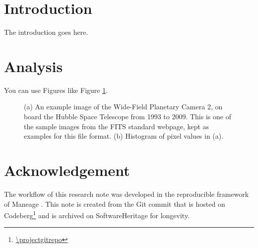 \documentclass[preprint2, times, twocolappendix]{aastex631}
\begin{document}
\title{\projecttitle}

\author[0000-0012-3245-1234]{Your Name}

\begin{abstract}
  \noindent
  The abstract goes here.
  The figures of this research note are reproducible with Maneage, on the Git commit \projectversion.
\end{abstract}











\section{Introduction}\label{sec:intro}
\noindent
The introduction goes here.

\section{Analysis}\label{sec:analysis}

You can use Figures like Figure \ref{fig:image-histogram}.

\begin{figure}[t]

  \caption{\label{fig:image-histogram} (a) An example image of the Wide-Field Planetary Camera 2, on board the Hubble Space Telescope from 1993 to 2009.
    This is one of the sample images from the FITS standard webpage, kept as examples for this file format.
    (b) Histogram of pixel values in (a).}
\end{figure}



\section{Acknowledgement}
The workflow of this research note was developed in the reproducible framework of Maneage \citep[\emph{Man}aging data lin\emph{eage},][latest Maneage commit \maneageversion{}, from \maneagedate]{maneage}.
This note is created from the Git commit {\projectversion} that is hosted on Codeberg\footnote{\url{\projectgitrepo}} and is archived on SoftwareHeritage for longevity.
\end{document}
